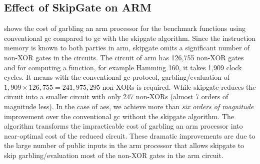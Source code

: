 \subsection{Effect of {SkipGate} on ARM}
 shows the cost of garbling an \gls{arm} processor for the benchmark functions using conventional \acrshort{gc} compared to \acrshort{gc} with the \gls{skipgate} algorithm.
Since the instruction memory is known to both parties in \gls{arm}, \gls{skipgate} omits a significant number of non-XOR gates in the circuits.
The circuit of \gls{arm} has 126,755 non-XOR gates and for computing a function, for example Hamming 160, it takes 1,909 clock cycles.
It means with the conventional \acrshort{gc} protocol, garbling/evaluation of $1,909\times126,755=241,975,295$ non-XORs is required.
While \gls{skipgate} reduces the circuit into a smaller circuit with only 247 non-XORs (almost 7 orders of magnitude less).
In the case of \acrshort{aes}, we achieve more than {\it six orders of magnitude} improvement over the conventional \acrshort{gc} without the \gls{skipgate} algorithm.
The algorithm transforms the impracticable cost of garbling an \gls{arm} processor into near-optimal cost of the reduced circuit.
These dramatic improvements are due to the large number of public inputs in the \gls{arm} processor that allows \gls{skipgate} to skip garbling/evaluation most of the non-XOR gates in the \gls{arm} circuit.

